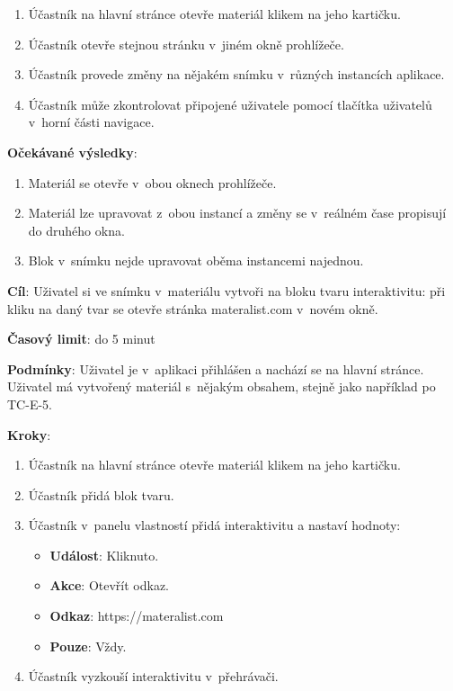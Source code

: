 \begin{enumerate}[leftmargin=1.4cm]
    \item Účastník na hlavní stránce otevře materiál klikem na jeho kartičku.
    \item Účastník otevře stejnou stránku v~jiném okně prohlížeče.
    \item Účastník provede změny na nějakém snímku v~různých instancích aplikace.
    \item Účastník může zkontrolovat připojené uživatele pomocí tlačítka uživatelů v~horní části navigace.
\end{enumerate}

\textbf{Očekávané výsledky}:

\begin{enumerate}[leftmargin=1.4cm]
    \item Materiál se otevře v~obou oknech prohlížeče.
    \item Materiál lze upravovat z~obou instancí a změny se v~reálném čase propisují do druhého okna.
    \item Blok v~snímku nejde upravovat oběma instancemi najednou.
\end{enumerate}





\vspace{1em}

\textbf{Cíl}: Uživatel si ve snímku v~materiálu vytvoři na bloku tvaru interaktivitu: při kliku na daný tvar se otevře stránka materalist.com v~novém okně.

\textbf{Časový limit}: do 5 minut

\textbf{Podmínky}:  Uživatel je v~aplikaci přihlášen a nachází se na hlavní stránce.  Uživatel má vytvořený materiál s~nějakým obsahem, stejně jako například po TC-E-5.

\textbf{Kroky}:

\begin{enumerate}[leftmargin=1.4cm]
    \item Účastník na hlavní stránce otevře materiál klikem na jeho kartičku.
    \item Účastník přidá blok tvaru.
    \item Účastník v~panelu vlastností přidá interaktivitu a nastaví hodnoty:
    \begin{itemize}
        \item \textbf{Událost}: Kliknuto.
        \item \textbf{Akce}: Otevřít odkaz.
        \item \textbf{Odkaz}: https://materalist.com
        \item \textbf{Pouze}: Vždy.
    \end{itemize}
    \item Účastník vyzkouší interaktivitu v~přehrávači.
\end{enumerate}

